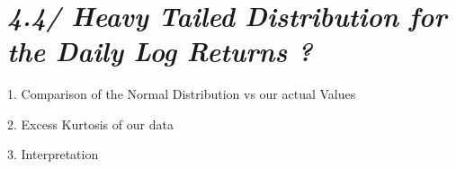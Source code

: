 \documentclass[11pt]{article}
\begin{document}
    \begin{center}
    \end{center}
    { \hspace*{\fill} \\}
    
    \section{\texorpdfstring{\emph{4.4/ Heavy Tailed Distribution for the
Daily Log Returns
?}}{4.4/ Heavy Tailed Distribution for the Daily Log Returns ?}}\label{heavy-tailed-distribution-for-the-daily-log-returns}

1. Comparison of the Normal Distribution vs our actual Values

2. Excess Kurtosis of our data

3. Interpretation
\end{document}
